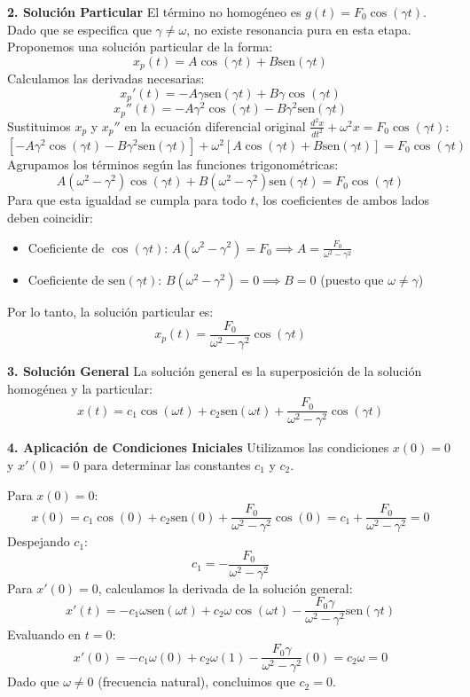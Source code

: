 \documentclass[a4paper]{article}
\begin{document}
\textbf{2. Solución Particular}
El término no homogéneo es $g(t) = F_0 \cos(\gamma t)$. Dado que se especifica que $\gamma \neq \omega$, no existe resonancia pura en esta etapa. Proponemos una solución particular de la forma:
$$
x_p(t) = A \cos(\gamma t) + B \text{sen}(\gamma t)
$$
Calculamos las derivadas necesarias:
$$
x_p'(t) = -A\gamma \text{sen}(\gamma t) + B\gamma \cos(\gamma t)
$$
$$
x_p''(t) = -A\gamma^2 \cos(\gamma t) - B\gamma^2 \text{sen}(\gamma t)
$$
Sustituimos $x_p$ y $x_p''$ en la ecuación diferencial original $\frac{d^2x}{dt^2} + \omega^2 x = F_0 \cos(\gamma t)$:
$$
[-A\gamma^2 \cos(\gamma t) - B\gamma^2 \text{sen}(\gamma t)] + \omega^2 [A \cos(\gamma t) + B \text{sen}(\gamma t)] = F_0 \cos(\gamma t)
$$
Agrupamos los términos según las funciones trigonométricas:
$$
A(\omega^2 - \gamma^2) \cos(\gamma t) + B(\omega^2 - \gamma^2) \text{sen}(\gamma t) = F_0 \cos(\gamma t)
$$
Para que esta igualdad se cumpla para todo $t$, los coeficientes de ambos lados deben coincidir:
\begin{itemize}
    \item Coeficiente de $\cos(\gamma t)$: $A(\omega^2 - \gamma^2) = F_0 \implies A = \frac{F_0}{\omega^2 - \gamma^2}$
    \item Coeficiente de $\text{sen}(\gamma t)$: $B(\omega^2 - \gamma^2) = 0 \implies B = 0$ (puesto que $\omega \neq \gamma$)
\end{itemize}
Por lo tanto, la solución particular es:
$$
x_p(t) = \frac{F_0}{\omega^2 - \gamma^2} \cos(\gamma t)
$$

\textbf{3. Solución General}
La solución general es la superposición de la solución homogénea y la particular:
$$
x(t) = c_1 \cos(\omega t) + c_2 \text{sen}(\omega t) + \frac{F_0}{\omega^2 - \gamma^2} \cos(\gamma t)
$$

\textbf{4. Aplicación de Condiciones Iniciales}
Utilizamos las condiciones $x(0)= 0$ y $x'(0)= 0$ para determinar las constantes $c_1$ y $c_2$.

Para $x(0) = 0$:
$$
x(0) = c_1 \cos(0) + c_2 \text{sen}(0) + \frac{F_0}{\omega^2 - \gamma^2} \cos(0) = c_1 + \frac{F_0}{\omega^2 - \gamma^2} = 0
$$
Despejando $c_1$:
$$
c_1 = -\frac{F_0}{\omega^2 - \gamma^2}
$$
Para $x'(0) = 0$, calculamos la derivada de la solución general:
$$
x'(t) = -c_1 \omega \text{sen}(\omega t) + c_2 \omega \cos(\omega t) - \frac{F_0 \gamma}{\omega^2 - \gamma^2} \text{sen}(\gamma t)
$$
Evaluando en $t = 0$:
$$
x'(0) = -c_1 \omega (0) + c_2 \omega (1) - \frac{F_0 \gamma}{\omega^2 - \gamma^2} (0) = c_2 \omega = 0
$$
Dado que $\omega \neq 0$ (frecuencia natural), concluimos que $c_2 = 0$.
\end{document}
